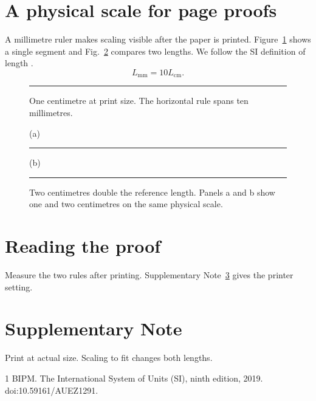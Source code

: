 \section{A physical scale for page proofs}
A millimetre ruler makes scaling visible after the paper is printed. Figure~\ref{fig:one} shows a single segment and Fig.~\ref{fig:two} compares two lengths. We follow the SI definition of length \cite{si}.
\begin{equation} L_{\mathrm{mm}}=10 L_{\mathrm{cm}}.\end{equation}
\begin{figure}[ht]\centering{}
\rule{10mm}{0.6bp}\caption{One centimetre at print size. The horizontal rule spans ten millimetres.}\label{fig:one}\end{figure}
\begin{figure}[t]\centering{}
(a) \rule{10mm}{0.6bp}\qquad (b) \rule{20mm}{0.6bp}
\caption{Two centimetres double the reference length. Panels a and b show one and two centimetres on the same physical scale.}\label{fig:two}\end{figure}
\section{Reading the proof}
Measure the two rules after printing. Supplementary Note~\ref{sec:print} gives the printer setting.
\section{Supplementary Note}\label{sec:print}
Print at actual size. Scaling to fit changes both lengths.
\begin{thebibliography}{1}
\makeatletter
{}
\makeatother BIPM. The International System of Units (SI), ninth edition, 2019. doi:10.59161/AUEZ1291.
\end{thebibliography}

